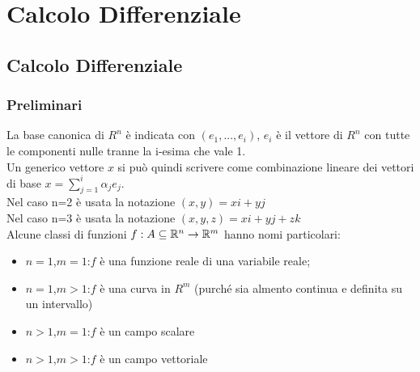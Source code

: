 \part{Calcolo Differenziale}

\chapter{Calcolo Differenziale}

\section{Preliminari}
La base canonica di $R^n$ è indicata con $(e_1,...,e_i)$, $e_i$ è il vettore di $R^n$ con tutte le componenti nulle tranne la i-esima che vale 1.\\
Un generico vettore $x$ si può quindi scrivere come combinazione lineare dei vettori di base $x=\sum\limits_{j=1}^{i}\alpha_j e_j$.\\
Nel caso n=2 è usata la notazione $(x,y)=xi+yj$\\
Nel caso n=3 è usata la notazione $(x,y,z)=xi+yj+zk$\\
Alcune classi di funzioni $f:A\subseteq\mathbb{R}^n\rightarrow\mathbb{R}^m$ hanno nomi particolari:
\begin{itemize}
	\item 
	$n=1$,$m=1$:$f$ è una funzione reale di una variabile reale;
	\item 
	$n=1$,$m>1$:$f$ è una curva in $R^m$ (purché sia almento continua e definita su un intervallo)
	\item 
	$n>1$,$m=1$:$f$ è un campo scalare
	\item
	$n>1$,$m>1$:$f$ è un campo vettoriale
\end{itemize}
